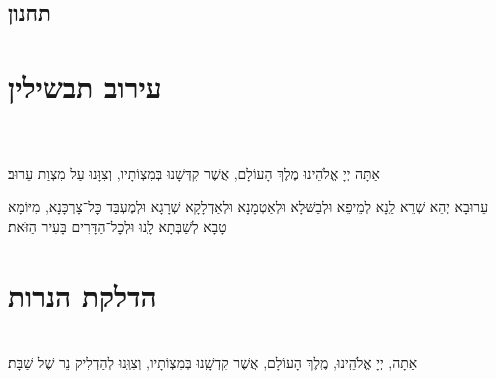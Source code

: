 \documentclass[twoside, openany, parskip=half, 11pt]{book}
\begin{document}

\avinumalkeinu

\vfill
{}\\

\section[תחנון]{ תחנון }


\nefilasapayim

\shomeryisroel

\fullkaddish

\label{mincha aleinu}

\aleinu
\mournerskaddish

\vfill

\quad{}\quad{}

\chapter[עירוב תבשילין]{ עירוב תבשילין }

\\
\\
אַתָּה יְיָ אֱלֹהֵינוּ מֶלֶךְ הָעוֹלָם, אֲשֶׁר קִדְּשָׁנוּ בְּמִצְוֹתָיו, וְצִוָּנוּ עַל מִצְוַת עֵרוּב׃

עֵרוּבָא יְהֵא שְׁרֵא לַֽנָא לְמֵיפֵא וּלְבַשּּׁלָא וּלְאַטְמָנָא וּלְאַדְלָקָא שְׁרָגָא וּלְמֶעְבַּד כׇּל־צָרְכָּנָא, מִיּוֹמָא טָבָא לְשַׁבְּתָא לָֽנוּ וּלְכׇל־הַדָּרִים בָּעִיר הַזּׂאת׃‏


\vspace{\baselineskip}
{\let\clearpage\relax
\chapter[הדלקת הנרות שבת ויו״ט]{ הדלקת הנרות }}

\\
אַתָה, יְיָ אֱלֹהֵֽינוּ, מֶֽלֶךְ הָעוֹלָם, אֲשֶׁר קִדְשָֽׁנוּ בְּמִצְוֹתָיו, וְצִוְּֽנוּ לְהַדְלִיק נֵר שֶׁל שַׁבָּת׃
\end{document}
